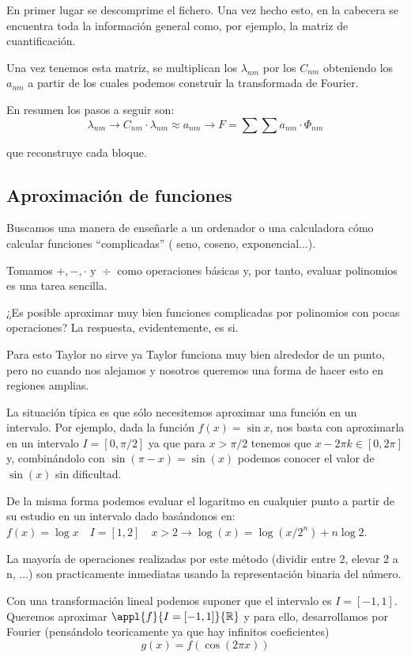 			En primer lugar se descomprime el fichero. Una vez hecho esto, en la cabecera se encuentra toda la información general como, por ejemplo,  la matriz de cuantificación.

			Una vez tenemos esta matriz, se multiplican los $\lambda_{nm}$ por los $C_{nm}$ obteniendo los $a_{nm}$ a partir de los cuales podemos construir la transformada de Fourier.

			En resumen los pasos a seguir son:
			$$\lambda_{nm} \rightarrow C_{nm}\cdot \lambda_{nm} \approx a_{nm} \rightarrow F = \sum \sum a_{nm} \cdot \Phi_{nm}$$

			que reconstruye cada bloque.

	\subsection{Aproximación de funciones}

		Buscamos una manera de enseñarle a un ordenador o una calculadora cómo calcular funciones ``complicadas'' ( seno, coseno, exponencial...).


		Tomamos $ +,-, \cdot \text{ y } \div$ como operaciones básicas y, por tanto, evaluar polinomios es una tarea sencilla.

		¿Es posible aproximar muy bien funciones complicadas por polinomios con pocas operaciones? La respuesta, evidentemente, es si.


		Para esto Taylor no sirve ya Taylor funciona muy bien alrededor de un punto, pero no cuando nos alejamos y nosotros queremos una forma de hacer esto en regiones amplias.


		La situación típica es que sólo necesitemos aproximar una función en un intervalo. Por ejemplo, dada la función $f(x) = \sin x $, nos basta con aproximarla en un intervalo $I= [0, \pi/2]$ ya que para $x > \pi/2$ tenemos que $x - 2\pi k \in [0, 2\pi]$ y, combinándolo con $\sin (\pi - x) = \sin (x)$ podemos conocer el valor de $\sin(x)$ sin dificultad.

		De la misma forma podemos evaluar el logaritmo en cualquier punto a partir de su estudio en un intervalo dado basándonos en:
		$f(x) = \log x \quad I= [1, 2] \quad x > 2 \rightarrow \log (x) = \log(x / 2^n) + n \log 2$.

		La mayoría de operaciones realizadas por este método (dividir entre 2, elevar 2 a n, ...) son practicamente inmediatas usando la representación binaria del número.


		Con una transformación lineal podemos suponer que el intervalo es $I = [-1,1]$. Queremos aproximar $\appl{f}{I = [-1,1]}{\mathbb{R}}$ y para ello, desarrollamos por Fourier (pensándolo teoricamente ya que hay infinitos coeficientes)
		\[g(x) = f(\cos(2 \pi x))\]

